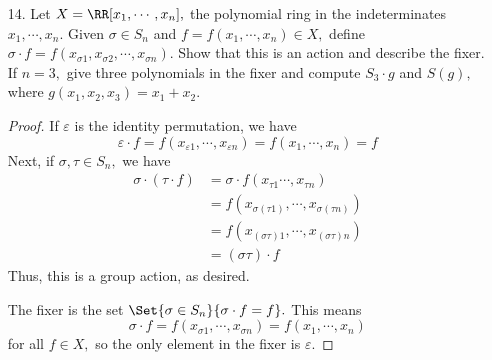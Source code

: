 \documentclass{article}
\begin{document}
\begin{itemize}
\begin{proof}
			Now, since $o(a)=5,$ we must have $5\mid k^n (k^3-1)$ for all $n$ where $1\le k\le 4.$ Obviously $5\nmid k^n$ so $5\mid (k^3-1),$ and it's easy to check that this holds only for $k=1.$ Thus, $bab\inv=a.$ Thus, $ba=ab,$ so $a$ and $b$ commute. Consider the order of $o(ab)=n.$ Then $(ab)^n=a^n b^n=1,$ and the smallest value this can happen for is 15. Thus, $G$ contains an element of order 15, so it is cyclic, as desired.
			
		\end{proof}

	\item[14.] Let $X=\RR[x_1, \cdots, x_n],$ the polynomial ring in the indeterminates $x_1,\cdots, x_n.$ Given $\sigma\in S_n$ and $f=f(x_1, \cdots, x_n)\in X,$ define $\sigma\cdot f = f(x_{\sigma1}, x_{\sigma2}, \cdots, x_{\sigma n}).$ Show that this is an action and describe the fixer. If $n=3,$ give three polynomials in the fixer and compute $S_3\cdot g$ and $S(g),$ where $g(x_1, x_2, x_3)=x_1+x_2.$
		\begin{proof}
			If $\varepsilon$ is the identity permutation, we have \[\varepsilon \cdot f = f(x_{\varepsilon1}, \cdots, x_{\varepsilon n}) = f(x_1, \cdots, x_n) = f\] Next, if $\sigma, \tau\in S_n,$ we have 
			\begin{align*}
				\sigma\cdot(\tau\cdot f) &= \sigma \cdot f(x_{\tau1}\cdots, x_{\tau n}) \\
				&= f(x_{\sigma(\tau1)}, \cdots, x_{\sigma(\tau n)} ) \\
				&= f(x_{(\sigma\tau)1}, \cdots, x_{(\sigma\tau) n} ) \\
				&= (\sigma\tau)\cdot f
			\end{align*}
			Thus, this is a group action, as desired.

			The fixer is the set $\Set{\sigma\in S_n}{\sigma\cdot f=f}.$ This means \[\sigma\cdot f=f(x_{\sigma1},\cdots, x_{\sigma n}) = f(x_1, \cdots, x_n)\] for all $f\in X,$ so the only element in the fixer is $\varepsilon.$ 


\end{proof}
\end{itemize}
\end{document}
